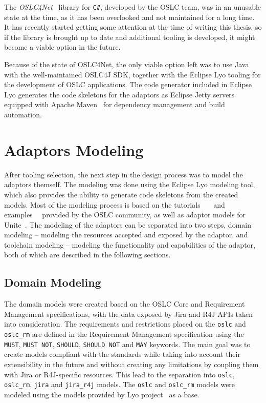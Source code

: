 The \emph{OSLC4Net} \cite{oslc4net} library for \texttt{C\#}, developed by the OSLC team, was in an unusable state at the time, as it has been overlooked and not maintained for a long time. It has recently started getting some attention at the time of writing this thesis, so if the library is brought up to date and additional tooling is developed, it might become a viable option in the future.

Because of the state of OSLC4Net, the only viable option left was to use Java with the well-maintained OSLC4J SDK, together with the Eclipse Lyo tooling for the development of OSLC applications. The code generator included in Eclipse Lyo generates the code skeletons for the adaptors as Eclipse Jetty servers \cite{jetty} equipped with Apache Maven \cite{maven} for dependency management and build automation.


\section{Adaptors Modeling}
\label{sec:adaptors_modeling}
After tooling selection, the next step in the design process was to model the adaptors themself. The modeling was done using the Eclipse Lyo modeling tool, which also provides the ability to generate code skeletons from the created models. Most of the modeling process is based on the tutorials \cite{oslc_domain_workshop} \cite{oslc_toolchain_workshop} \cite{youtube_lyo_tutorial} and examples \cite{github_oslc_lyo-adaptor-sample-modelling} \cite{github_oslc_bugzilla} provided by the OSLC community, as well as adaptor models for Unite \cite{unite_gitlab}. The modeling of the adaptors can be separated into two steps, domain modeling -- modeling the resources accepted and exposed by the adaptor, and toolchain modeling -- modeling the functionality and capabilities of the adaptor, both of which are described in the following sections.

\subsection{Domain Modeling}
The domain models were created based on the OSLC Core and Requirement Management specifications, with the data exposed by Jira and R4J APIs taken into consideration. The requirements and restrictions placed on the \texttt{oslc} and \texttt{oslc\_rm} are defined in the Requirement Management specification using the \texttt{MUST}, \texttt{MUST NOT}, \texttt{SHOULD}, \texttt{SHOULD NOT} and \texttt{MAY} keywords. The main goal was to create models compliant with the standards while taking into account their extensibility in the future and without creating any limitations by coupling them with Jira or R4J-specific resources. This lead to the separation into \texttt{oslc}, \texttt{oslc\_rm}, \texttt{jira} and \texttt{jira\_r4j} models. The \texttt{oslc} and \texttt{oslc\_rm} models were modeled using the models provided by Lyo project \cite{lyo_domains} as a base.

